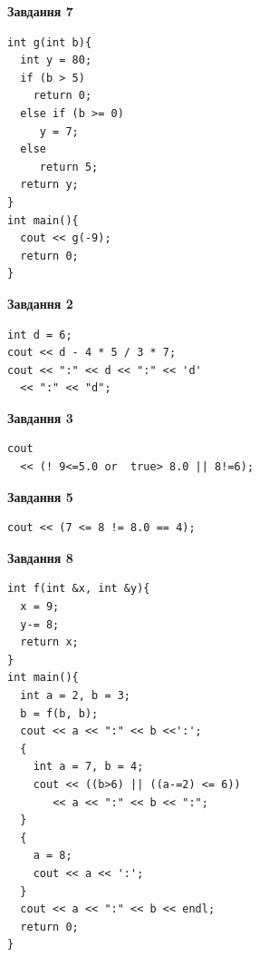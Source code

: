\documentclass[12pt, ukrainian]{article}
\begin{document}
{\begin {large}
\begin{minipage}[t]{7.0cm}
\begin{center}
\textbf{Завдання 7}
\end{center}
\vspace{-8mm}

\begin{verbatim}
int g(int b){
  int y = 80;
  if (b > 5)
    return 0;
  else if (b >= 0)
     y = 7;
  else
     return 5;
  return y;
}
int main(){
  cout << g(-9);
  return 0;
}
\end{verbatim}

\end{minipage}
\vline \hspace{1mm}
\begin{minipage}[t]{11.0cm}

\begin{center}
\textbf{Завдання 2}
\end{center}
\vspace{-8mm}

\begin{verbatim}
int d = 6;
cout << d - 4 * 5 / 3 * 7;
cout << ":" << d << ":" << 'd' 
  << ":" << "d";
\end{verbatim}



\begin{center}
\textbf{Завдання 3}
\end{center}
\vspace{-8mm}

\begin{verbatim}
cout 
  << (! 9<=5.0 or  true> 8.0 || 8!=6);
\end{verbatim}



\begin{center}
\textbf{Завдання 5}
\end{center}
\vspace{-8mm}

\begin{verbatim}
cout << (7 <= 8 != 8.0 == 4);
\end{verbatim}



\begin{center}
\textbf{Завдання 8}
\end{center}
\vspace{-8mm}

\begin{verbatim}
int f(int &x, int &y){
  x = 9;
  y-= 8;
  return x;
}
int main(){
  int a = 2, b = 3;
  b = f(b, b);
  cout << a << ":" << b <<':';
  {
    int a = 7, b = 4;
    cout << ((b>6) || ((a-=2) <= 6))
       << a << ":" << b << ":";
  }
  {
    a = 8;
    cout << a << ':';
  }
  cout << a << ":" << b << endl;
  return 0;
}
\end{verbatim}


\end{minipage}
\end{large}}
\end{document}
